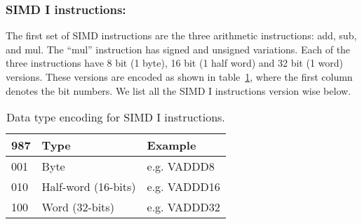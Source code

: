 \subsubsection{SIMD I instructions:}
\label{sec:simd:1:insn:impl}

The  first   set  of  SIMD  instructions  are   the  three  arithmetic
instructions: add,  sub, and mul.  The ``mul''  instruction has signed
and unsigned variations.  Each of the three instructions have 8 bit (1
byte),  16 bit  (1 half  word) and  32 bit  (1 word)  versions.  These
versions  are encoded  as  shown in  table~\ref{tab:types:for:simd:1},
where the first column denotes the  bit numbers.  We list all the SIMD
I instructions version wise below.
\begin{table}[h]
  \centering
  \begin{tabular}[p]{|l|l|l|}
  \hline
  \textbf{987} & \textbf{Type} & \textbf{Example}\\
  \hline
  001 & Byte & e.g. VADDD8\\
  010 & Half-word (16-bits) & e.g. VADDD16\\
  100 & Word (32-bits) & e.g. VADDD32\\
  \hline
\end{tabular}
\caption{Data type encoding for SIMD I instructions.}
\label{tab:types:for:simd:1}
\end{table}
